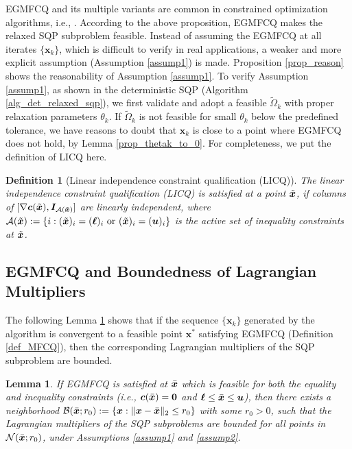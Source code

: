 \documentclass[aos]{imsart}
\numberwithin{equation}{section}
\theoremstyle{plain}
\newtheorem{definition}{Definition}
\newtheorem{lemma}{Lemma}
\begin{document}
\begin{appendix}
EGMFCQ and its multiple variants are common in constrained optimization algorithms, i.e., \cite{burke1989robust, xu2015smoothing}. According to the above proposition, EGMFCQ makes the relaxed SQP subproblem feasible. Instead of assuming the EGMFCQ at all iterates $\{\bm{x}_k\}$, which is difficult to verify in real applications, a weaker and more explicit assumption (Assumption \ref{assump1}) is made. Proposition \ref{prop_reason} shows the reasonability of Assumption \ref{assump1}. To verify Assumption \ref{assump1}, as shown in the deterministic SQP (Algorithm \ref{alg_det_relaxed_sqp}), we first validate and adopt a feasible $\widetilde{\Omega}_k$ with proper relaxation parameters $\theta_k$. If $\widetilde{\Omega}_k$ is not feasible for small $\theta_k$ below the predefined tolerance, we have reasons to doubt that $\bm{x}_k$ is close to a point where EGMFCQ does not hold, by Lemma \ref{prop_thetak_to_0}. For completeness, we put the definition of LICQ here.

\begin{definition}
    [Linear independence constraint qualification (LICQ)]
    \label{definition_LICQ}
    The linear independence constraint qualification (LICQ) is satisfied at a point $\Tilde{\bm{x}}$, if columns of $[\nabla \bm{c}(\Tilde{\bm{x}}), \bm{I}_{\mathcal{A}(\Tilde{\bm{x}})}]$ are linearly independent, where $\mathcal{A}(\Tilde{\bm{x}}):=\{i: (\Tilde{\bm{x}})_i = (\bm{\ell})_i~\text{or}~(\Tilde{\bm{x}})_i = (\bm{u})_i\}$ is the active set of inequality constraints at $\Tilde{\bm{x}}$.
\end{definition}


\subsection{EGMFCQ and Boundedness of Lagrangian Multipliers}
\label{sec:appendix1.2}
 The following Lemma \ref{lemma_mfcq} shows that if the sequence $\{\bm{x}_k\}$ generated by the algorithm is convergent to a feasible point $\bm{x}^{*}$ satisfying EGMFCQ (Definition \ref{def_MFCQ}), then the corresponding Lagrangian multipliers of the SQP subproblem are bounded. 


 \begin{lemma}
\label{lemma_mfcq}
    If EGMFCQ is satisfied at $\Bar{\bm{x}}$ which is feasible for both the equality and inequality constraints (i.e., $\bm{c}(\Bar{\bm{x}}) = \bm{0}$ and $\bm{\ell} \leq \Bar{\bm{x}} \leq \bm{u}$), then there exists a neighborhood $\mathcal{B}(\Bar{\bm{x}}; r_0):= \{\bm{x}: \|\bm{x} - \Bar{\bm{x}}\|_2 \leq r_0\}$ with some  $r_0>0$, such that the Lagrangian multipliers of the SQP subproblems are bounded for all points in $\mathcal{N}(\Bar{\bm{x}}; r_0)$, under Assumptions \ref{assump1} and \ref{assump2}.  
\end{lemma}


\end{appendix}
\end{document}
